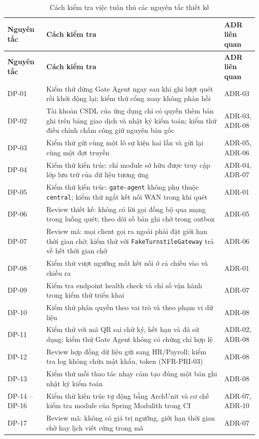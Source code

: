 \begingroup
\small
\renewcommand{\arraystretch}{1.3}
\begin{longtable}{|>{\centering\arraybackslash}p{1.4cm}|>{\raggedright\arraybackslash}p{11.0cm}|>{\raggedright\arraybackslash}p{2.6cm}|}
\caption{Cách kiểm tra việc tuân thủ các nguyên tắc thiết kế}\label{tab:dp-compliance}\\
\hline
\textbf{Nguyên tắc} & \textbf{Cách kiểm tra} & \textbf{ADR liên quan} \\
\hline
\endfirsthead
\hline
\textbf{Nguyên tắc} & \textbf{Cách kiểm tra} & \textbf{ADR liên quan} \\
\hline
\endhead
\hline
\endfoot
\endlastfoot
DP-01 & Kiểm thử dừng Gate Agent ngay sau khi ghi lượt quét rồi khởi động lại; kiểm thử cổng xoay không phản hồi & ADR-03 \\
\hline
DP-02 & Tài khoản CSDL của ứng dụng chỉ có quyền thêm bản ghi trên bảng giao dịch và nhật ký kiểm toán; kiểm thử điều chỉnh chấm công giữ nguyên bản gốc & ADR-03, ADR-08 \\
\hline
DP-03 & Kiểm thử gửi cùng một lô sự kiện hai lần và gửi lại cùng một đợt truyền & ADR-05, ADR-06 \\
\hline
DP-04 & Kiểm thử kiến trúc: chỉ module sở hữu được truy cập lớp lưu trữ của dữ liệu tương ứng & ADR-04, ADR-07 \\
\hline
DP-05 & Kiểm thử kiến trúc: \texttt{gate-agent} không phụ thuộc \texttt{central}; kiểm thử ngắt kết nối WAN trong khi quét & ADR-01 \\
\hline
DP-06 & Review thiết kế: không có lời gọi đồng bộ qua mạng trong luồng quét; theo dõi số bản ghi chờ trong outbox & ADR-05 \\
\hline
DP-07 & Review mã: mọi client gọi ra ngoài phải đặt giới hạn thời gian chờ; kiểm thử với \texttt{FakeTurnstileGateway} trả về hết thời gian chờ & ADR-06 \\
\hline
DP-08 & Kiểm thử vượt ngưỡng mất kết nối ở cả chiều vào và chiều ra & ADR-01 \\
\hline
DP-09 & Kiểm tra endpoint health check và chỉ số vận hành trong kiểm thử triển khai & ADR-07 \\
\hline
DP-10 & Kiểm thử phân quyền theo vai trò và theo phạm vi dữ liệu & ADR-08 \\
\hline
DP-11 & Kiểm thử với mã QR sai chữ ký, hết hạn và đã sử dụng; kiểm thử Gate Agent không có chứng chỉ hợp lệ & ADR-02, ADR-08 \\
\hline
DP-12 & Review hợp đồng dữ liệu gửi sang HR/Payroll; kiểm tra log không chứa mật khẩu, token (NFR-PRI-03) & ADR-08 \\
\hline
DP-13 & Kiểm thử mỗi thao tác nhạy cảm tạo đúng một bản ghi nhật ký kiểm toán & ADR-08 \\
\hline
DP-14 -- DP-16 & Kiểm thử kiến trúc tự động bằng ArchUnit và cơ chế kiểm tra module của Spring Modulith trong CI & ADR-07, ADR-10 \\
\hline
DP-17 & Review mã: không có giá trị ngưỡng, giới hạn thời gian chờ hay lịch viết cứng trong mã & ADR-07 \\
\hline
\end{longtable}
\endgroup
